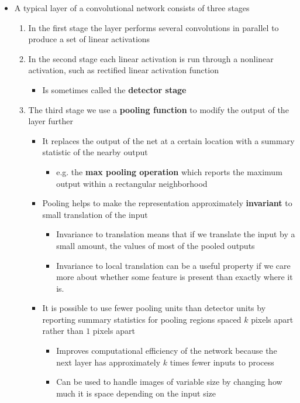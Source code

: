 \documentclass[11pt]{article}
\begin{document}
\begin{itemize}
\item A typical layer of a convolutional network consists of three stages
\begin{enumerate}
\item In the first stage the layer performs several convolutions in parallel to produce a set of linear activations
\item In the second stage each linear activation is run through a nonlinear activation, such as rectified linear activation function
\begin{itemize}
\item Is sometimes called the \textbf{detector stage}
\end{itemize}
\item The third stage we use a \textbf{pooling function} to modify the output of the layer further
\begin{itemize}
\item It replaces the output of the net at a certain location with a summary statistic of the nearby output
\begin{itemize}
\item e.g. the \textbf{max pooling operation} which reports the maximum output within a rectangular neighborhood
\end{itemize}
\item Pooling helps to make the representation approximately \textbf{invariant} to small translation of the input
\begin{itemize}
\item Invariance to translation means that if we translate the input by a small amount, the values of most of the pooled outputs
\item Invariance to local translation can be a useful property if we care more about whether some feature is present than exactly where it is.
\end{itemize}
\item It is possible to use fewer pooling units than detector units by reporting summary statistics for pooling regions spaced \(k\) pixels apart rather than \(1\) pixels apart
\begin{itemize}
\item Improves computational efficiency of the network because the next layer has approximately \(k\) times fewer inputs to process
\item Can be used to handle images of variable size by changing how much it is space depending on the input size
\end{itemize}
\end{itemize}
\end{enumerate}
\end{itemize}
\end{document}
